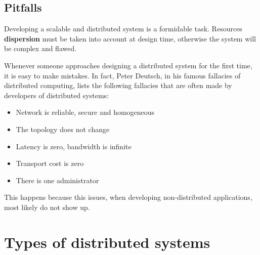 


\subsection{Pitfalls}
Developing a scalable and distributed system is a formidable task.
Resources \textbf{dispersion} must be taken into account at design time, otherwise the system will be complex and flawed.

Whenever someone approaches designing a distributed system for the first time, it is easy to make mistakes. In fact, Peter Deutsch, in his famous fallacies of distributed computing, lists the following fallacies that are often made by developers of distributed systems:
\begin{itemize}
   \item Network is reliable, secure and homogeneous
   \item The topology does not change
   \item Latency is zero, bandwidth is infinite
   \item Transport cost is zero
   \item There is one administrator
\end{itemize}

This happens because this issues, when developing non-distributed applications, most likely do not show up.



\section{Types of distributed systems}

